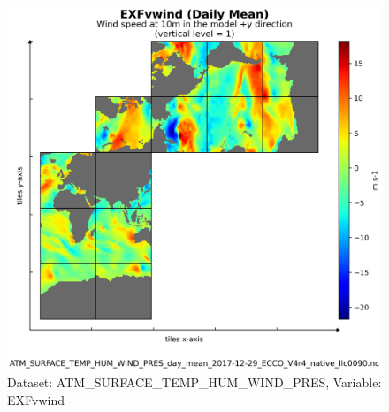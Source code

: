 \begin{figure}[H]
\centering
\includegraphics[scale=0.55]{../images/plots/v4r4/native_plots/Atmosphere_Surface_Temperature_Humidity_Wind_and_Pressure/EXFvwind.png}
\caption{Dataset: ATM\_SURFACE\_TEMP\_HUM\_WIND\_PRES, Variable: EXFvwind}
\label{tab:table-ATM_SURFACE_TEMP_HUM_WIND_PRES_EXFvwind-Plot}
\end{figure}
\newpage
\pagebreak
